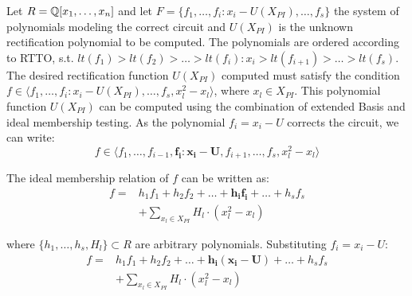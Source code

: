 

Let $R = {\mathbb{Q}}[x_1,\dots,x_n]$ and let $F =
\{f_1,\dots,f_i:x_i-U(X_{PI}),\dots,f_s\}$ the system of polynomials
modeling the correct circuit and $U(X_{PI})$ is the unknown
rectification polynomial to be computed. The polynomials are ordered
according to RTTO, s.t. $lt(f_1) > lt(f_2) > \dots > lt(f_i):x_i
> lt(f_{i+1}) > \dots > lt(f_s)$. The desired rectification function
$U(X_{PI})$ computed must satisfy the condition $f \in \langle
f_1,\dots,f_i:x_i-U(X_{PI}),\dots,f_s,x_l^2-x_l \rangle$, where $x_l
\in X_{PI}$. This polynomial function $U(X_{PI})$ can be computed
using the combination of extended \Grobner Basis and ideal membership
testing. As the polynomial $f_i = x_i-U$ corrects the circuit, we can write:
\vspace{-1mm}
\begin{equation}
\label{eq:eqn1}
   f \in \langle  f_1,\dots,f_{i-1},\boldsymbol{f_i: x_i - U},f_{i+1},\dots,f_s,  x_l^2-x_l \rangle 
\end{equation}

The ideal membership relation of $f$ can be written as:
\vspace{-0.5mm}
\begin{equation}
    \label{eq:eqn2}
\begin{split}
f = & h_1f_1 + h_2f_2 + \dots+\boldsymbol{h_if_i}+\dots+h_sf_s \\
& + \sum_{x_l \in X_{PI}} H_l
\cdot(x_l^2-x_l)    
\end{split}
\end{equation}

where $\{h_1,\dots,h_s,H_l\} \subset R$ are arbitrary polynomials. Substituting $f_i = x_i - U$:
\vspace{-1mm}
\begin{equation}
\begin{split}
    f = & h_1f_1 + h_2f_2 + \dots+\boldsymbol{h_i(x_i-U)}+\dots+h_sf_s \\
    & + \sum_{x_l \in X_{PI}} H_l \cdot(x_l^2-x_l)
\end{split}
\end{equation} 
\vspace{-0.25in}

